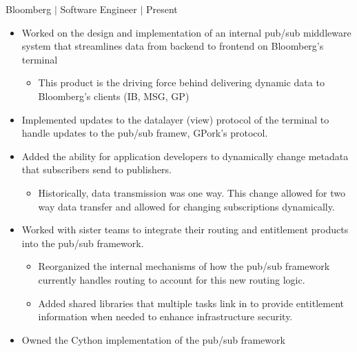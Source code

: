 \documentclass[12pt]{article}
\newcommand{\textDate}[3]{\noindent#1 $|$ #2 $|$ {\color{textGray} #3}}
\begin{document}
    \textDate{Bloomberg}{Software Engineer}{Present}
    \begin{small}
        \begin{itemize}
            \itemsep0em 
            \item {\color{textGray} Worked on the design and implementation of an internal pub/sub middleware system that streamlines data from backend to frontend on Bloomberg's terminal}
                \begin{itemize}[label=$\circ$,topsep=-5px,partopsep=0px]
                    \itemsep0em 
                    \item {\color{textGray} This product is the driving force behind delivering dynamic data to Bloomberg's clients (IB, MSG, GP)}
                \end{itemize}
            \item {\color{textGray} Implemented updates to the datalayer (view) protocol of the terminal to handle updates to the pub/sub framew, GPork's protocol.}
            \item {\color{textGray} Added the ability for application developers to dynamically change metadata that subscribers send to publishers.}
                \begin{itemize}[label=$\circ$,topsep=-5px,partopsep=0px]
                    \itemsep0em 
                    \item {\color{textGray} Historically, data transmission was one way. This change allowed for two way data transfer and allowed for changing subscriptions dynamically.}
                \end{itemize}
            \item {\color{textGray} Worked with sister teams to integrate their routing and entitlement products into the pub/sub framework.}
                \begin{itemize}[label=$\circ$,topsep=-5px,partopsep=0px]
                    \itemsep0em 
                    \item {\color{textGray} Reorganized the internal mechanisms of how the pub/sub framework currently handles routing to account for this new routing logic.}
                    \item {\color{textGray} Added shared libraries that multiple tasks link in to provide entitlement information when needed to enhance infrastructure security.}
                \end{itemize}
            \item {\color{textGray} Owned the Cython implementation of the pub/sub framework}

\end{itemize}
\end{small}
\end{document}
